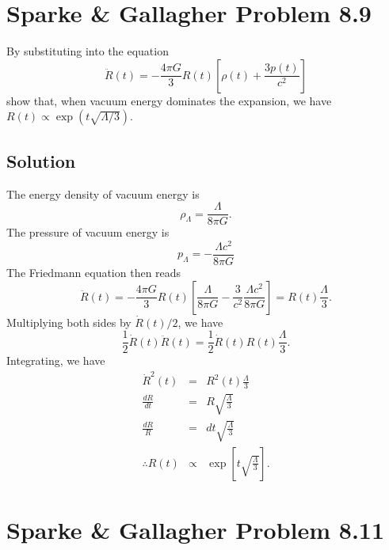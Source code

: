 \documentclass[]{article}
\begin{document}
\section{Sparke \& Gallagher Problem 8.9}

By substituting into the equation
\begin{equation}
\ddot{R}(t) = -\frac{4\pi G}{3} R(t)\left[ \rho(t) + \frac{3p(t)}{c^2}\right]
\end{equation}
\noindent
show that, when vacuum energy dominates the expansion, we have $R(t) \propto \exp(t\sqrt{\Lambda/3})$.

\subsection{Solution}

The energy density of vacuum energy is 
\begin{equation}
\rho_{\Lambda} = \frac{\Lambda}{8\pi G}.
\end{equation}
\noindent
The pressure of vacuum energy is
\begin{equation}
p_{\Lambda} = -\frac{\Lambda c^2}{8\pi G}
\end{equation}
\noindent
The Friedmann equation then reads
\begin{equation}
\ddot{R}(t) = -\frac{4\pi G}{3} R(t)\left[ \frac{\Lambda}{8\pi G} - \frac{3}{c^2}\frac{\Lambda c^2}{8\pi G}\right] = R(t) \frac{\Lambda}{3}.
\end{equation}
\noindent
Multiplying both sides by $\dot{R}(t)/2$, we have
\begin{equation}
\frac{1}{2}\dot{R}(t)\ddot{R}(t) = \frac{1}{2} \dot{R}(t) R(t) \frac{\Lambda}{3}.
\end{equation}
\noindent
Integrating, we have
\begin{eqnarray}
\dot{R}^2(t) &=& R^2(t)\frac{\Lambda}{3} \\
\frac{dR}{dt} &=& R\sqrt{\frac{\Lambda}{3}}\\
\frac{dR}{R} &=&dt\sqrt{\frac{\Lambda}{3}}\\
\therefore R(t) &\propto& \exp\left[t\sqrt{\frac{\Lambda}{3}}\right].
\end{eqnarray}

\section{Sparke \& Gallagher Problem 8.11}
\end{document}
